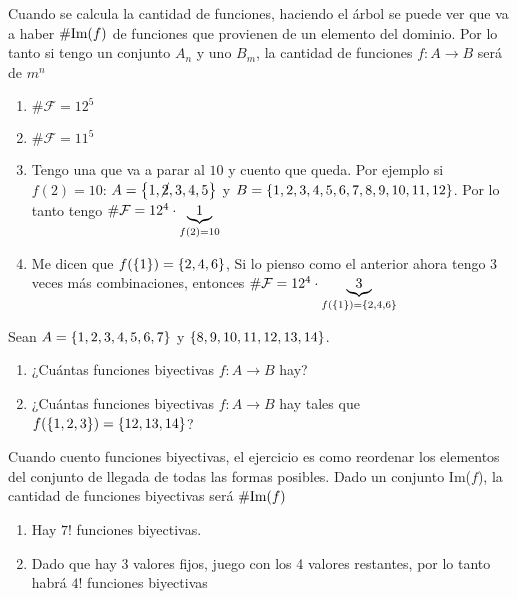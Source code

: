 \separadorCorto

Cuando se calcula la cantidad de funciones, haciendo el árbol se puede ver que va a haber $\#\text{Im}(f)$ de funciones que provienen
de un elemento del dominio. Por lo tanto si tengo un conjunto $A_n$ y uno $B_m$, la cantidad de funciones $f : A \to B$ será
de $m^n$\\

\begin{enumerate}[label=\roman*)]
	\item $\# \mathcal F = 12^5$

	\item $\# \mathcal F = 11^5$

	\item Tengo una que va a parar al $10$ y cuento que queda. Por ejemplo si $f(2) = 10$: $A = \left\{ 1,\cancel{2},3,4,5 \right\}$ y $B = \left\{ 1,2,3,4,5,6,7,8,9,10,11,12 \right\}$.
	      Por lo tanto tengo $\# \mathcal F = 12^4 \cdot \underbrace{\normalsize 1}_{f (2) = 10}$\\

	\item Me dicen que $f(\left\{ 1 \right\}) = \left\{ 2,4,6 \right\}$,
	      Si lo pienso como el anterior ahora tengo 3 veces más combinaciones, entonces
	      $\# \mathcal F = 12^4 \cdot \underbrace{\tiny 3}_{ f (\left\{ 1 \right\})= \left\{ 2,4,6 \right\}}$
\end{enumerate}

\ejercicio
Sean $A = \left\{ 1,2,3,4,5,6,7 \right\}$ y $\left\{ 8,9,10,11,12,13,14 \right\}$.
\begin{enumerate}[label=\roman*)]
	\item ¿Cuántas funciones biyectivas $f: A \to B$ hay?
	\item ¿Cuántas funciones biyectivas $f: A \to B$ hay tales que $f(\left\{ 1,2,3 \right\}) = \left\{ 12,13,14 \right\}$?
\end{enumerate}

\separadorCorto

Cuando cuento funciones biyectivas, el ejercicio es como reordenar los elementos del conjunto de llegada de todas las
formas posibles. Dado un conjunto Im($f$), la cantidad de funciones biyectivas será $\#\text{Im}(f)$

\begin{enumerate}[label=\roman*)]
	\item Hay $7!$ funciones biyectivas.
	\item Dado que hay 3 valores fijos, juego con los 4 valores restantes, por lo tanto habrá $4!$ funciones biyectivas
\end{enumerate}

